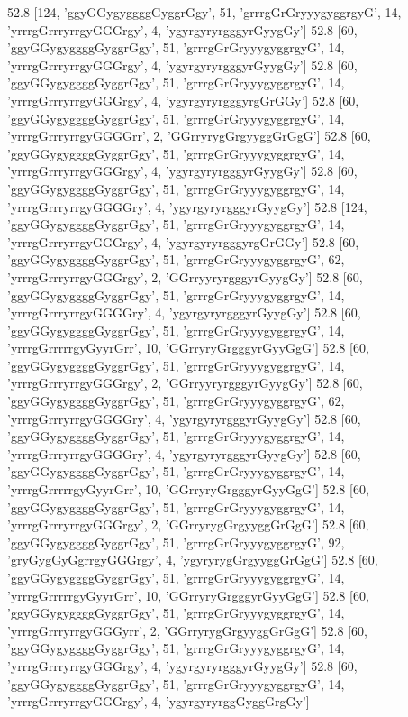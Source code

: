52.8 [124, 'ggyGGygyggggGyggrGgy', 51, 'grrrgGrGryyygyggrgyG', 14, 'yrrrgGrrryrrgyGGGrgy', 4, 'ygyrgyryrgggyrGyygGy']
52.8 [60, 'ggyGGygyggggGyggrGgy', 51, 'grrrgGrGryyygyggrgyG', 14, 'yrrrgGrrryrrgyGGGrgy', 4, 'ygyrgyryrgggyrGyygGy']
52.8 [60, 'ggyGGygyggggGyggrGgy', 51, 'grrrgGrGryyygyggrgyG', 14, 'yrrrgGrrryrrgyGGGrgy', 4, 'ygyrgyryrgggyrgGrGGy']
52.8 [60, 'ggyGGygyggggGyggrGgy', 51, 'grrrgGrGryyygyggrgyG', 14, 'yrrrgGrrryrrgyGGGGrr', 2, 'GGrryrygGrgyyggGrGgG']
52.8 [60, 'ggyGGygyggggGyggrGgy', 51, 'grrrgGrGryyygyggrgyG', 14, 'yrrrgGrrryrrgyGGGrgy', 4, 'ygyrgyryrgggyrGyygGy']
52.8 [60, 'ggyGGygyggggGyggrGgy', 51, 'grrrgGrGryyygyggrgyG', 14, 'yrrrgGrrryrrgyGGGGry', 4, 'ygyrgyryrgggyrGyygGy']
52.8 [124, 'ggyGGygyggggGyggrGgy', 51, 'grrrgGrGryyygyggrgyG', 14, 'yrrrgGrrryrrgyGGGrgy', 4, 'ygyrgyryrgggyrgGrGGy']
52.8 [60, 'ggyGGygyggggGyggrGgy', 51, 'grrrgGrGryyygyggrgyG', 62, 'yrrrgGrrryrrgyGGGrgy', 2, 'GGrryyryrgggyrGyygGy']
52.8 [60, 'ggyGGygyggggGyggrGgy', 51, 'grrrgGrGryyygyggrgyG', 14, 'yrrrgGrrryrrgyGGGGry', 4, 'ygyrgyryrgggyrGyygGy']
52.8 [60, 'ggyGGygyggggGyggrGgy', 51, 'grrrgGrGryyygyggrgyG', 14, 'yrrrgGrrrrrgyGyyrGrr', 10, 'GGrryryGrgggyrGyyGgG']
52.8 [60, 'ggyGGygyggggGyggrGgy', 51, 'grrrgGrGryyygyggrgyG', 14, 'yrrrgGrrryrrgyGGGrgy', 2, 'GGrryyryrgggyrGyygGy']
52.8 [60, 'ggyGGygyggggGyggrGgy', 51, 'grrrgGrGryyygyggrgyG', 62, 'yrrrgGrrryrrgyGGGGry', 4, 'ygyrgyryrgggyrGyygGy']
52.8 [60, 'ggyGGygyggggGyggrGgy', 51, 'grrrgGrGryyygyggrgyG', 14, 'yrrrgGrrryrrgyGGGGry', 4, 'ygyrgyryrgggyrGyygGy']
52.8 [60, 'ggyGGygyggggGyggrGgy', 51, 'grrrgGrGryyygyggrgyG', 14, 'yrrrgGrrrrrgyGyyrGrr', 10, 'GGrryryGrgggyrGyyGgG']
52.8 [60, 'ggyGGygyggggGyggrGgy', 51, 'grrrgGrGryyygyggrgyG', 14, 'yrrrgGrrryrrgyGGGrgy', 2, 'GGrryrygGrgyyggGrGgG']
52.8 [60, 'ggyGGygyggggGyggrGgy', 51, 'grrrgGrGryyygyggrgyG', 92, 'gryGygGyGgrrgyGGGrgy', 4, 'ygyryrygGrgyyggGrGgG']
52.8 [60, 'ggyGGygyggggGyggrGgy', 51, 'grrrgGrGryyygyggrgyG', 14, 'yrrrgGrrrrrgyGyyrGrr', 10, 'GGrryryGrgggyrGyyGgG']
52.8 [60, 'ggyGGygyggggGyggrGgy', 51, 'grrrgGrGryyygyggrgyG', 14, 'yrrrgGrrryrrgyGGGyrr', 2, 'GGrryrygGrgyyggGrGgG']
52.8 [60, 'ggyGGygyggggGyggrGgy', 51, 'grrrgGrGryyygyggrgyG', 14, 'yrrrgGrrryrrgyGGGrgy', 4, 'ygyrgyryrgggyrGyygGy']
52.8 [60, 'ggyGGygyggggGyggrGgy', 51, 'grrrgGrGryyygyggrgyG', 14, 'yrrrgGrrryrrgyGGGrgy', 4, 'ygyrgyryrggGyggGrgGy']
